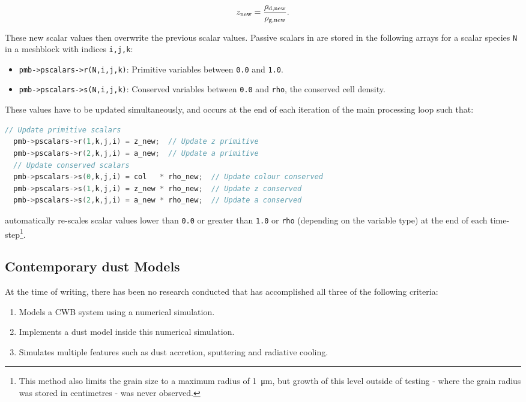 \begin{equation}
  z_\text{new} = \frac{\rho_\text{d,new}}{\rho_\text{g,new}} . 
\end{equation}

\noindent
These new scalar values then overwrite the previous scalar values.
Passive scalars in \athena{} are stored in the following arrays for a scalar species \texttt{N} in a meshblock with indices \texttt{i,j,k}:

\begin{itemize}
  \item \texttt{pmb->pscalars->r(N,i,j,k)}: Primitive variables between \texttt{0.0} and \texttt{1.0}.
  \item \texttt{pmb->pscalars->s(N,i,j,k)}: Conserved variables between \texttt{0.0} and \texttt{rho}, the conserved cell density.
\end{itemize}

\noindent
These values have to be updated simultaneously, and occurs at the end of each iteration of the main processing loop such that:

\begin{lstlisting}[language=c++]
  // Update primitive scalars
  pmb->pscalars->r(1,k,j,i) = z_new;  // Update z primitive
  pmb->pscalars->r(2,k,j,i) = a_new;  // Update a primitive
  // Update conserved scalars 
  pmb->pscalars->s(0,k,j,i) = col   * rho_new;  // Update colour conserved
  pmb->pscalars->s(1,k,j,i) = z_new * rho_new;  // Update z conserved
  pmb->pscalars->s(2,k,j,i) = a_new * rho_new;  // Update a conserved
\end{lstlisting}

\noindent
\athena{} automatically re-scales scalar values lower than \texttt{0.0} or greater than \texttt{1.0} or \texttt{rho} (depending on the variable type) at the end of each time-step\footnote{This method also limits the grain size to a maximum radius of \SI{1}{\micro\metre}, but growth of this level outside of testing - where the grain radius was stored in centimetres - was never observed.}.

\subsection{Contemporary dust Models}

At the time of writing, there has been no research conducted that has accomplished all three of the following criteria:

\begin{enumerate}
  \item Models a CWB system using a numerical simulation.
  \item Implements a dust model inside this numerical simulation.
  \item Simulates multiple features such as dust accretion, sputtering and radiative cooling.
\end{enumerate}

